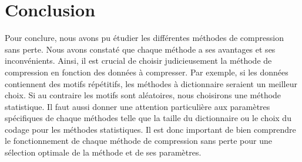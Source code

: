 \section{Conclusion}

Pour conclure, nous avons pu étudier les différentes méthodes de compression sans perte. Nous avons constaté que chaque méthode a ses avantages et ses inconvénients. Ainsi, il est crucial de choisir judicieusement la méthode de compression en fonction des données à compresser. Par exemple, si les données contiennent des motifs répétitifs, les méthodes à dictionnaire seraient un meilleur choix. Si au contraire les motifs sont aléatoires, nous choisirons une méthode statistique. Il faut aussi donner une attention particulière aux paramètres spécifiques de chaque méthodes telle que la taille du dictionnaire ou le choix du codage pour les méthodes statistiques. Il est donc important de bien comprendre le fonctionnement de chaque méthode de compression sans perte pour une sélection optimale de la méthode et de ses paramètres.